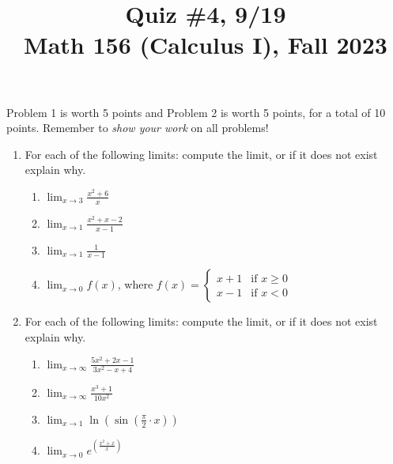 \documentclass[11pt]{article}
\title{Quiz \#4, 9/19 \\ Math 156 (Calculus I), Fall 2023}
\date{}
\begin{document}
\maketitle

\thispagestyle{empty}

\vspace{-2cm}

Problem 1 is worth 5 points and Problem 2 is worth 5 points, for a total of 10 points. Remember to \emph{show your work} on all problems!

\begin{enumerate}
\item For each of the following limits: compute the limit, or if it does not exist explain why.
\begin{enumerate}
\item $\displaystyle \lim_{x \to 3} \frac{x^2+6}{x}$
\item $\displaystyle \lim_{x \to 1} \frac{x^2+x-2}{x-1}$
\item $\displaystyle \lim_{x \to 1} \frac{1}{x-1}$
\item $\displaystyle \lim_{x \to 0} f(x)$, where $f(x) = \begin{cases} x+1 &\textrm{if $x \geq 0$} \\ x-1 &\textrm{if $x < 0$} \end{cases}$
\end{enumerate}

\vspace{2.15in}

\item For each of the following limits: compute the limit, or if it does not exist explain why.
\begin{enumerate}
\item $\displaystyle \lim_{x \to \infty} \frac{5x^2+2x-1}{3x^2-x+4}$
\item $\displaystyle \lim_{x \to \infty} \frac{x^3+1}{10x^2}$
\item $\displaystyle \lim_{x \to 1} \ln(\sin(\frac{\pi}{2} \cdot x))$
\item $\displaystyle \lim_{x \to 0} e^{(\frac{x^2+x}{x})}$
\end{enumerate}

\end{enumerate}
\end{document}
